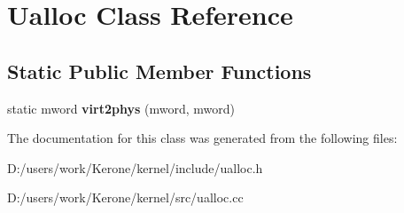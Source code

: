 \section{Ualloc Class Reference}
\label{class_ualloc}
\subsection*{Static Public Member Functions}
\begin{DoxyCompactItemize}
\item 
\mbox{\label{class_ualloc_a292865e99a70d757b9394a62e26d6e7e}} 
static mword {\bfseries virt2phys} (mword, mword)
\end{DoxyCompactItemize}


The documentation for this class was generated from the following files\+:\begin{DoxyCompactItemize}
\item 
D\+:/users/work/\+Kerone/kernel/include/ualloc.\+h\item 
D\+:/users/work/\+Kerone/kernel/src/ualloc.\+cc\end{DoxyCompactItemize}
